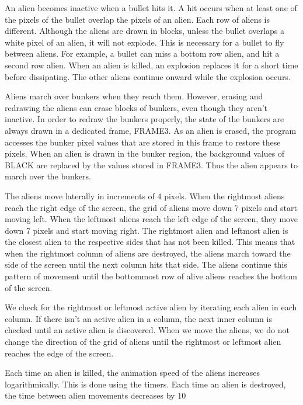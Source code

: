 \documentclass[11pt,letter,oneside]{report}
\begin{document}
An alien becomes inactive when a bullet hits it. A hit occurs when at least one of the pixels of the bullet overlap the pixels of an alien. Each row of aliens is different. Although the aliens are drawn in blocks, unless the bullet overlaps a white pixel of an alien, it will not explode. This is necessary for a bullet to fly between aliens. For example, a bullet can miss a bottom row alien, and hit a second row alien. When an alien is killed, an explosion replaces it for a short time before dissipating. The other aliens continue onward while the explosion occurs.

Aliens march over bunkers when they reach them. However, erasing and redrawing the aliens can erase blocks of bunkers, even though they aren't inactive. In order to redraw the bunkers properly, the state of the bunkers are always drawn in a dedicated frame, FRAME3.  As an alien is erased, the program accesses the bunker pixel values that are stored in this frame to restore these pixels. When an alien is drawn in the bunker region, the background values of BLACK are replaced by the values stored in FRAME3. Thus the alien appears to march over the bunkers.

The aliens move laterally in increments of 4 pixels.  When the rightmost aliens reach the right edge of the screen, the grid of aliens move down 7 pixels and start moving left.  When the leftmost aliens reach the left edge of the screen, they move down 7 pixels and start moving right.  The rightmost alien and leftmost alien is the closest alien to the respective sides that has not been killed. This means that when the rightmost column of aliens are destroyed, the aliens march toward the side of the screen until the next column hits that side. The aliens continue this pattern of movement until the bottommost row of alive aliens reaches the bottom of the screen. 

We check for the rightmost or leftmost active alien by iterating each alien in each column. If there isn't an active alien in a column, the next inner column is checked until an active alien is discovered. When we move the aliens, we do not change the direction of the grid of aliens until the rightmost or leftmost alien reaches the edge of the screen.

Each time an alien is killed, the animation speed of the aliens increases logarithmically. This is done using the timers. Each time an alien is destroyed, the time between alien movements decreases by 10%
\end{document}
